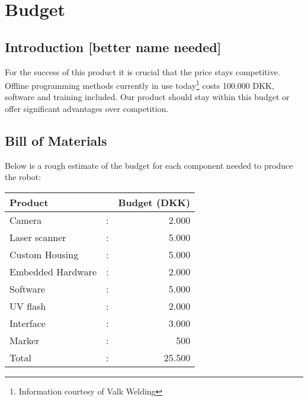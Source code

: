 \section{Budget}\label{budget_label}
\subsection{Introduction [better name needed]}
For the success of this product it is crucial that the price stays competitive. Offline programming methods currently in use today\footnote{Information courtesy of Valk Welding} costs 100.000 DKK, software and training included. Our product should stay within this budget or offer significant advantages over competition.
\subsection{Bill of Materials}
Below is a rough estimate of the budget for each component needed to produce the robot:
\begin{center}
\begin{tabular}{l c r}
Product           &   & Budget (DKK)\\
\hline
Camera            & : & 2.000  \\
Laser scanner     & : & 5.000 \\
Custom Housing    & : & 5.000\\
Embedded Hardware & : & 2.000\\
Software          & : & 5.000\\
UV flash          & : & 2.000\\
Interface         & : & 3.000\\
Marker            & : & 500\\[0.2cm]
\hline
Total             & : & 25.500\\ 
\end{tabular}
\end{center}
